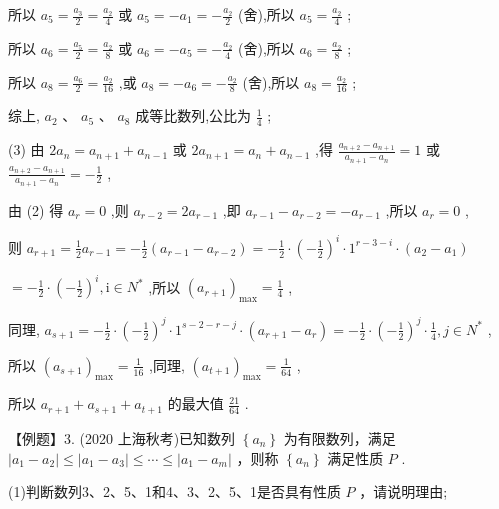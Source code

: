 \documentclass[10pt]{article}
\begin{document}
所以 \({a}_{5} = \frac{{a}_{3}}{2} = \frac{{a}_{2}}{4}\) 或 \({a}_{5} =  - {a}_{1} =  - \frac{{a}_{2}}{2}\) (舍),所以 \({a}_{5} = \frac{{a}_{2}}{4}\) ;

所以 \({a}_{6} = \frac{{a}_{5}}{2} = \frac{{a}_{2}}{8}\) 或 \({a}_{6} =  - {a}_{5} =  - \frac{{a}_{2}}{4}\) (舍),所以 \({a}_{6} = \frac{{a}_{2}}{8}\) ;

所以 \({a}_{8} = \frac{{a}_{6}}{2} = \frac{{a}_{2}}{16}\) ,或 \({a}_{8} =  - {a}_{6} =  - \frac{{a}_{2}}{8}\) (舍),所以 \({a}_{8} = \frac{{a}_{2}}{16}\) ;

综上, \({a}_{2}\text{ 、 }{a}_{5}\text{ 、 }{a}_{8}\) 成等比数列,公比为 \(\frac{1}{4}\) ;

(3) 由 \(2{a}_{n} = {a}_{n + 1} + {a}_{n - 1}\) 或 \(2{a}_{n + 1} = {a}_{n} + {a}_{n - 1}\) ,得 \(\frac{{a}_{n + 2} - {a}_{n + 1}}{{a}_{n + 1} - {a}_{n}} = 1\) 或 \(\frac{{a}_{n + 2} - {a}_{n + 1}}{{a}_{n + 1} - {a}_{n}} =  - \frac{1}{2}\) ,

由 (2) 得 \({a}_{r} = 0\) ,则 \({a}_{r - 2} = 2{a}_{r - 1}\) ,即 \({a}_{r - 1} - {a}_{r - 2} =  - {a}_{r - 1}\) ,所以 \({a}_{r} = 0\) ,

则 \({a}_{r + 1} = \frac{1}{2}{a}_{r - 1} =  - \frac{1}{2}\left( {{a}_{r - 1} - {a}_{r - 2}}\right)  =  - \frac{1}{2} \cdot  {\left( -\frac{1}{2}\right) }^{i} \cdot  {1}^{r - 3 - i} \cdot  \left( {{a}_{2} - {a}_{1}}\right)\)

\(=  - \frac{1}{2} \cdot  {\left( -\frac{1}{2}\right) }^{i},\mathrm{i} \in  {N}^{ * }\) ,所以 \({\left( {a}_{r + 1}\right) }_{\max } = \frac{1}{4}\) ,

同理, \({a}_{s + 1} =  - \frac{1}{2} \cdot  {\left( -\frac{1}{2}\right) }^{j} \cdot  {1}^{s - 2 - r - j} \cdot  \left( {{a}_{r + 1} - {a}_{r}}\right)  =  - \frac{1}{2} \cdot  {\left( -\frac{1}{2}\right) }^{j} \cdot  \frac{1}{4},j \in  {N}^{ * }\) ,

所以 \({\left( {a}_{s + 1}\right) }_{\max } = \frac{1}{16}\) ,同理, \({\left( {a}_{t + 1}\right) }_{\max } = \frac{1}{64}\) ,

所以 \({a}_{r + 1} + {a}_{s + 1} + {a}_{t + 1}\) 的最大值 \(\frac{21}{64}\) .

【例题】3. (2020 上海秋考)已知数列 \(\left\{  {a}_{n}\right\}\) 为有限数列，满足 \(\left| {{a}_{1} - {a}_{2}}\right|  \leq  \left| {{a}_{1} - {a}_{3}}\right|  \leq  \cdots  \leq  \left| {{a}_{1} - {a}_{m}}\right|\) ，则称 \(\left\{  {a}_{n}\right\}\) 满足性质 \(P\) .

(1)判断数列3、2、5、1和4、3、2、5、1是否具有性质 \(P\) ，请说明理由;
\end{document}
